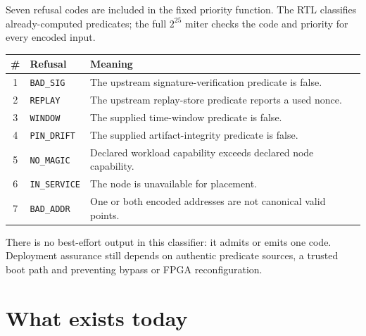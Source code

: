\documentclass[11pt,letterpaper]{article}
\begin{document}
Seven refusal codes are included in the fixed priority function. The RTL
classifies already-computed predicates; the full $2^{25}$ miter checks the code
and priority for every encoded input.

\begin{center}
\renewcommand{\arraystretch}{1.2}
\begin{tabular}{@{}c l p{}@{}}
\toprule
\textbf{\#} & \textbf{Refusal} & \textbf{Meaning} \\
\midrule
1 & \texttt{BAD\_SIG} & The upstream signature-verification predicate is false.\\
2 & \texttt{REPLAY} & The upstream replay-store predicate reports a used nonce.\\
3 & \texttt{WINDOW} & The supplied time-window predicate is false.\\
4 & \texttt{PIN\_DRIFT} & The supplied artifact-integrity predicate is false.\\
5 & \texttt{NO\_MAGIC} & Declared workload capability exceeds declared node capability.\\
6 & \texttt{IN\_SERVICE} & The node is unavailable for placement.\\
7 & \texttt{BAD\_ADDR} & One or both encoded addresses are not canonical valid points.\\
\bottomrule
\end{tabular}
\end{center}

There is no best-effort output in this classifier: it admits or emits one code.
Deployment assurance still depends on authentic predicate sources, a trusted
boot path and preventing bypass or FPGA reconfiguration.

\newpage

\section{What exists today}
\end{document}
